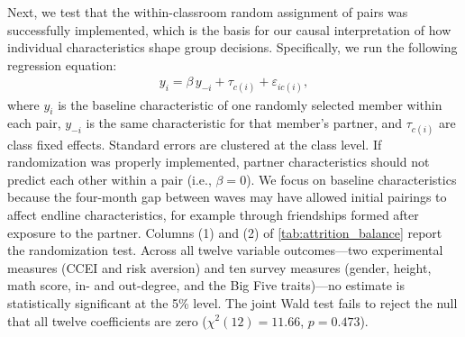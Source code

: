 \documentclass[11 pt]{article}
\begin{document}
Next, we test that the within-classroom random assignment of pairs was successfully implemented, which is the basis for our causal interpretation of how individual characteristics shape group decisions. Specifically, we run the following regression equation:
\begin{align}\label{eqn:randomization}
y_{i} = \beta\, y_{-i} + \tau_{c(i)} + \varepsilon_{ic(i)},
\end{align}
where $y_i$ is the baseline characteristic of one randomly selected member within each pair, $y_{-i}$ is the same characteristic for that member's partner, and $\tau_{c(i)}$ are class fixed effects. Standard errors are clustered at the class level. If randomization was properly implemented, partner characteristics should not predict each other within a pair (i.e., $\beta = 0$). We focus on baseline characteristics because the four-month gap between waves may have allowed initial pairings to affect endline characteristics, for example through friendships formed after exposure to the partner. Columns (1) and (2) of \autoref{tab:attrition_balance} report the randomization test. Across all twelve variable outcomes---two experimental measures (CCEI and risk aversion) and ten survey measures (gender, height, math score, in- and out-degree, and the Big Five traits)---no estimate is statistically significant at the 5\% level. The joint Wald test fails to reject the null that all twelve coefficients are zero ($\chi^{2}(12) = 11.66$, $p = 0.473$).
\end{document}
